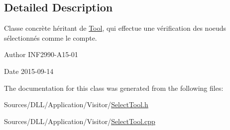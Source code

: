 \subsection{Detailed Description}
Classe concrète héritant de \hyperlink{class_tool}{Tool}, qui effectue une vérification des noeuds sélectionnés comme le compte. 

\begin{DoxyAuthor}{Author}
I\+N\+F2990-\/\+A15-\/01 
\end{DoxyAuthor}
\begin{DoxyDate}{Date}
2015-\/09-\/14 
\end{DoxyDate}


The documentation for this class was generated from the following files\+:\begin{DoxyCompactItemize}
\item 
Sources/\+D\+L\+L/\+Application/\+Visitor/\hyperlink{_select_tool_8h}{Select\+Tool.\+h}\item 
Sources/\+D\+L\+L/\+Application/\+Visitor/\hyperlink{_select_tool_8cpp}{Select\+Tool.\+cpp}\end{DoxyCompactItemize}
